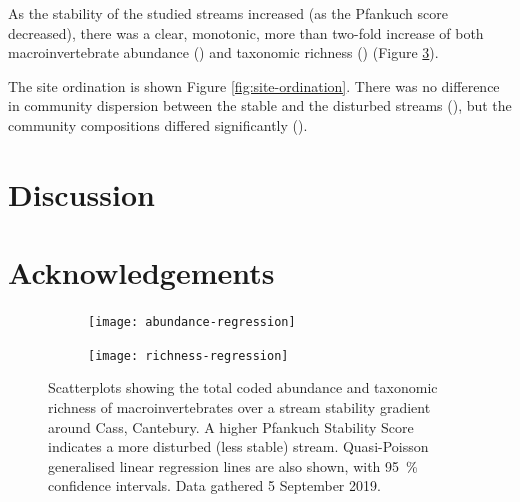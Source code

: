 \documentclass[a4paper,10pt]{article}
\newcommand\inputresults[1]{\unskip}
\newcommand\datadate{5 September 2019} %
\begin{document}
As the stability of the studied streams increased (as the Pfankuch score decreased), there was a clear, monotonic, more than two-fold increase of both macroinvertebrate abundance (\inputresults{abundance-regression}) and taxonomic richness (\inputresults{richness-regression}) (Figure \ref{fig:regressions}).

The site ordination is shown Figure \ref{fig:site-ordination}.
There was no difference in community dispersion between the stable and the disturbed streams (\inputresults{permdisp}), but the community compositions differed significantly (\inputresults{permanova}).

\section*{Discussion}

\section*{Acknowledgements}

\clearpage

\begin{figure}[p]
	\centering
	\begin{subfigure}[t]{\textwidth}
		\centering
		\texttt{[image: abundance-regression]}
		\caption{}\label{fig:abundance-regression}
	\end{subfigure}
	\begin{subfigure}[t]{\textwidth}
		\centering
		\texttt{[image: richness-regression]}
		\caption{}\label{fig:richness-regression}
	\end{subfigure}
	\caption[Regression plots]{ %
		Scatterplots showing the total coded abundance and taxonomic richness of macroinvertebrates over a stream stability gradient around Cass, Cantebury.
		A higher Pfankuch Stability Score indicates a more disturbed (less stable) stream.
		Quasi-Poisson generalised linear regression lines are also shown, with \SI{95}{\percent} confidence intervals.
		Data gathered {\datadate}.
	}\label{fig:regressions}
\end{figure}
\end{document}
